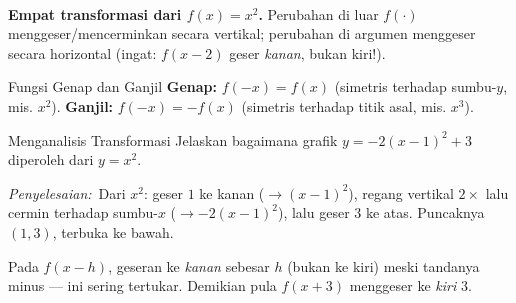 \documentclass[11pt,a4paper]{report}
\theoremstyle{gaya}
\newcommand{\jawab}{\par\smallskip\noindent\textit{\textcolor{oranye}{Penyelesaian:}}\ }
\begin{document}
\begin{center}
\\
\small \textbf{Empat transformasi dari $f(x)=x^2$.} Perubahan di luar $f(\cdot)$ menggeser/mencerminkan secara vertikal; perubahan di argumen menggeser secara horizontal (ingat: $f(x-2)$ geser \emph{kanan}, bukan kiri!).
\end{center}

\begin{konsep}{Fungsi Genap dan Ganjil}
\textbf{Genap:} $f(-x)=f(x)$ (simetris terhadap sumbu-$y$, mis. $x^2$). \textbf{Ganjil:} $f(-x)=-f(x)$ (simetris terhadap titik asal, mis. $x^3$).
\end{konsep}

\begin{contoh}{Menganalisis Transformasi}
Jelaskan bagaimana grafik $y=-2(x-1)^2+3$ diperoleh dari $y=x^2$.

\jawab Dari $x^2$: geser $1$ ke kanan ($\to(x-1)^2$), regang vertikal $2\times$ lalu cermin terhadap sumbu-$x$ ($\to-2(x-1)^2$), lalu geser $3$ ke atas. Puncaknya $(1,3)$, terbuka ke bawah.
\end{contoh}

\begin{kesalahan}
Pada $f(x-h)$, geseran ke \emph{kanan} sebesar $h$ (bukan ke kiri) meski tandanya minus --- ini sering tertukar. Demikian pula $f(x+3)$ menggeser ke \emph{kiri} $3$.
\end{kesalahan}
\end{document}
